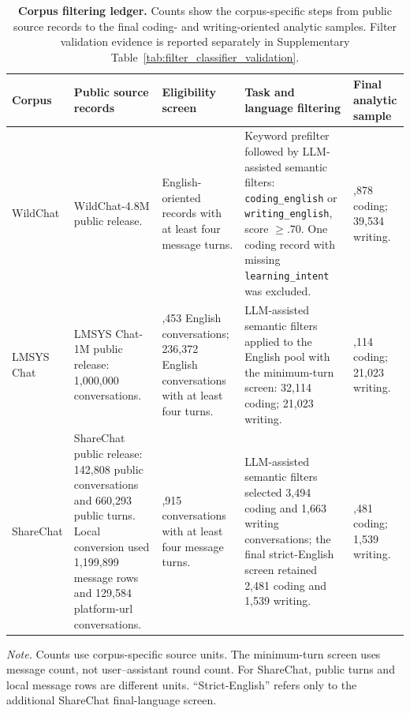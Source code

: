 \begin{table}[!htbp]
\fontsize{6.2pt}{7.0pt}\selectfont
\centering
\caption{\textbf{Corpus filtering ledger.} Counts show the corpus-specific steps from public source records to the final coding- and writing-oriented analytic samples. Filter validation evidence is reported separately in Supplementary Table~\ref{tab:filter_classifier_validation}.}
\label{tab:corpus_filtering_pipeline}
\setlength{\tabcolsep}{3pt}
\renewcommand{\arraystretch}{1.08}
\begin{tabularx}{\textwidth}{>{\raggedright\arraybackslash}p{}>{\raggedright\arraybackslash}p{}>{\raggedright\arraybackslash}p{}>{\raggedright\arraybackslash}p{}>{\raggedright\arraybackslash}X}
\toprule
Corpus
& Public source records
& Eligibility screen
& Task and language filtering
& Final analytic sample \\
\midrule
WildChat
& WildChat-4.8M public release.
& English-oriented records with at least four message turns.
& Keyword prefilter followed by LLM-assisted semantic filters: \texttt{coding\_english} or \texttt{writing\_english}, score $\geq .70$. One coding record with missing \texttt{learning\_intent} was excluded.
& 31,878 coding; 39,534 writing. \\
\addlinespace
LMSYS Chat
& LMSYS Chat-1M public release: 1,000,000 conversations.
& 777,453 English conversations; 236,372 English conversations with at least four turns.
& LLM-assisted semantic filters applied to the English pool with the minimum-turn screen: 32,114 coding; 21,023 writing.
& 32,114 coding; 21,023 writing. \\
\addlinespace
ShareChat
& ShareChat public release: 142,808 public conversations and 660,293 public turns. Local conversion used 1,199,899 message rows and 129,584 platform-url conversations.
& 69,915 conversations with at least four message turns.
& LLM-assisted semantic filters selected 3,494 coding and 1,663 writing conversations; the final strict-English screen retained 2,481 coding and 1,539 writing.
& 2,481 coding; 1,539 writing. \\
\bottomrule
\end{tabularx}

\vspace{1mm}
\begin{minipage}{0.96\textwidth}
\fontsize{6.2pt}{7.0pt}\selectfont
\textit{Note.} Counts use corpus-specific source units. The minimum-turn screen uses message count, not user--assistant round count. For ShareChat, public turns and local message rows are different units. ``Strict-English'' refers only to the additional ShareChat final-language screen.
\end{minipage}
\end{table}
